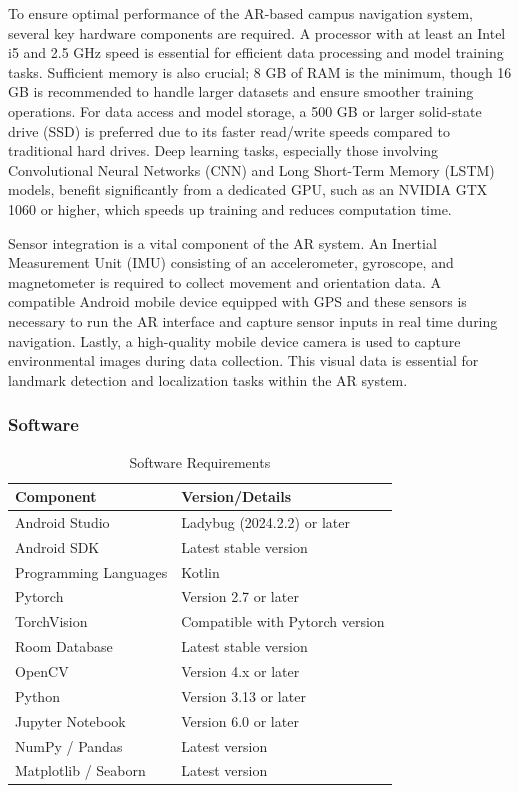 \begin{refsection}
To ensure optimal performance of the AR-based campus navigation system, several key hardware components are required. A processor with at least an Intel i5 and 2.5 GHz speed is essential for efficient data processing and model training tasks. Sufficient memory is also crucial; 8 GB of RAM is the minimum, though 16 GB is recommended to handle larger datasets and ensure smoother training operations. For data access and model storage, a 500 GB or larger solid-state drive (SSD) is preferred due to its faster read/write speeds compared to traditional hard drives. Deep learning tasks, especially those involving Convolutional Neural Networks (CNN) and Long Short-Term Memory (LSTM) models, benefit significantly from a dedicated GPU, such as an NVIDIA GTX 1060 or higher, which speeds up training and reduces computation time.

Sensor integration is a vital component of the AR system. An Inertial Measurement Unit (IMU) consisting of an accelerometer, gyroscope, and magnetometer is required to collect movement and orientation data. A compatible Android mobile device equipped with GPS and these sensors is necessary to run the AR interface and capture sensor inputs in real time during navigation. Lastly, a high-quality mobile device camera is used to capture environmental images during data collection. This visual data is essential for landmark detection and localization tasks within the AR system.

\subsubsection{Software}

\begin{table}[H]
\centering
\caption{Software Requirements}
\begin{tabular}{ll}
\hline
\textbf{Component}    & \textbf{Version/Details}        \\ \hline
Android Studio        & Ladybug (2024.2.2) or later     \\
Android SDK           & Latest stable version           \\
Programming Languages & Kotlin                          \\
Pytorch               & Version 2.7 or later            \\
TorchVision           & Compatible with Pytorch version \\
Room Database         & Latest stable version           \\
OpenCV                & Version 4.x or later            \\
Python                & Version 3.13 or later           \\
Jupyter Notebook      & Version 6.0 or later            \\
NumPy / Pandas        & Latest version                  \\
Matplotlib / Seaborn  & Latest version                  \\ \hline
\end{tabular}
\label{tab:secondTab}
\end{table}


\end{refsection}
